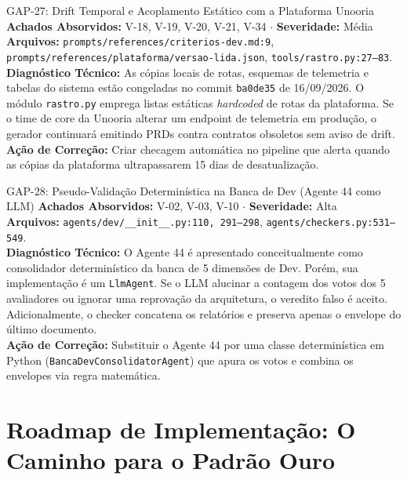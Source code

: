 \documentclass[11pt,a4paper]{article}
\begin{document}
\begin{gapbox}{GAP-27: Drift Temporal e Acoplamento Estático com a Plataforma Unooria}
\textbf{Achados Absorvidos:} V-18, V-19, V-20, V-21, V-34 $\cdot$ \textbf{Severidade:} Média\\
\textbf{Arquivos:} \texttt{prompts/references/criterios-dev.md:9}, \texttt{prompts/references/plataforma/versao-lida.json}, \texttt{tools/rastro.py:27--83}.\\
\textbf{Diagnóstico Técnico:} As cópias locais de rotas, esquemas de telemetria e tabelas do sistema estão congeladas no commit \texttt{ba0de35} de 16/09/2026. O módulo \texttt{rastro.py} emprega listas estáticas \textit{hardcoded} de rotas da plataforma. Se o time de core da Unooria alterar um endpoint de telemetria em produção, o gerador continuará emitindo PRDs contra contratos obsoletos sem aviso de drift.\\
\textbf{Ação de Correção:} Criar checagem automática no pipeline que alerta quando as cópias da plataforma ultrapassarem 15 dias de desatualização.
\end{gapbox}

\begin{gapbox}{GAP-28: Pseudo-Validação Determinística na Banca de Dev (Agente 44 como LLM)}
\textbf{Achados Absorvidos:} V-02, V-03, V-10 $\cdot$ \textbf{Severidade:} Alta\\
\textbf{Arquivos:} \texttt{agents/dev/\_\_init\_\_.py:110, 291--298}, \texttt{agents/checkers.py:531--549}.\\
\textbf{Diagnóstico Técnico:} O Agente 44 é apresentado conceitualmente como consolidador determinístico da banca de 5 dimensões de Dev. Porém, sua implementação é um \texttt{LlmAgent}. Se o LLM alucinar a contagem dos votos dos 5 avaliadores ou ignorar uma reprovação da arquitetura, o veredito falso é aceito. Adicionalmente, o checker concatena os relatórios e preserva apenas o envelope do último documento.\\
\textbf{Ação de Correção:} Substituir o Agente 44 por uma classe determinística em Python (\texttt{BancaDevConsolidatorAgent}) que apura os votos e combina os envelopes via regra matemática.
\end{gapbox}

\newpage
\section{Roadmap de Implementação: O Caminho para o Padrão Ouro}
\end{document}

